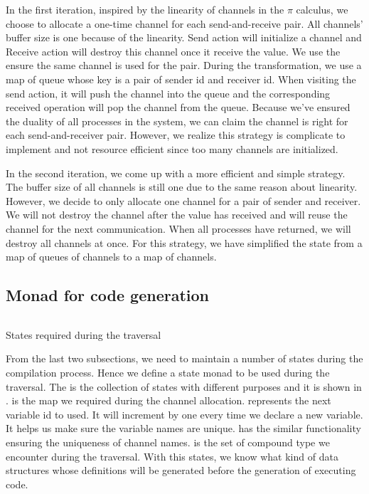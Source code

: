 In the first iteration, inspired by the linearity of channels in the $\pi$ calculus, we choose to allocate a one-time channel for each send-and-receive pair. All channels' buffer size is one because of the linearity. Send action will initialize a channel and Receive action will destroy this channel once it receive the value. We use the ensure the same channel is used for the pair. During the transformation, we use a map of queue whose key is a pair of sender id  and receiver id. When visiting the send action, it will push the channel into the queue and the corresponding received operation will pop the channel from the queue. Because we've ensured the duality of all processes in the system, we can claim the channel is right for each send-and-receiver pair. However, we realize this strategy is complicate to implement and not resource efficient since too many channels are initialized.

In the second iteration, we come up with a more efficient and simple strategy. The buffer size of all channels is still one due to the same reason about linearity. However, we decide to only allocate one channel for a pair of sender and receiver. We will not destroy the channel after the value has received and will reuse the channel for the next communication. When all processes have returned, we will destroy all channels at once. For this strategy, we have simplified the state from a map of queues of channels to a map of channels.
\subsection{Monad for code generation}
\begin{listing}[ht]
    \inputminted{Haskell}{codegen/monad.hs} 
    \caption{States required during the traversal}
    \label{codegen:code:monad}
\end{listing}
From the last two subsections, we need to maintain a number of states during the compilation process. Hence we define a state monad to be used during the traversal. The  is the collection of states with different purposes and it is shown in .  is the map we required during the channel allocation.  represents the next variable id to used. It will increment by one every time we declare a new variable. It helps us make sure the variable names are unique.  has the similar functionality ensuring the uniqueness of channel names.  is the set of compound type we encounter during the traversal. With this states, we know what kind of data structures whose definitions will be generated before the generation of executing code.

